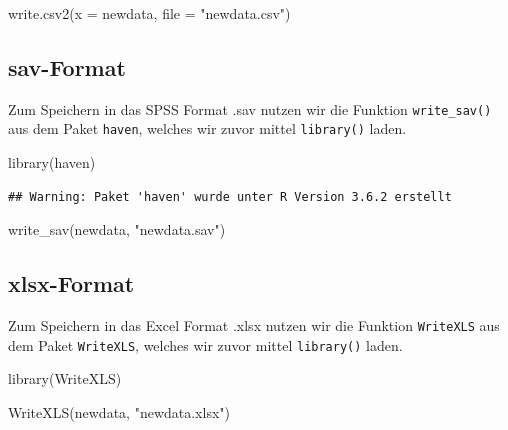 \documentclass[
]{book}
\newenvironment{Shaded}{\begin{snugshade}}{\end{snugshade}}
\newcommand{\AttributeTok}[1]{\textcolor[rgb]{0.77,0.63,0.00}{#1}}
\newcommand{\FunctionTok}[1]{\textcolor[rgb]{0.00,0.00,0.00}{#1}}
\newcommand{\NormalTok}[1]{#1}
\newcommand{\StringTok}[1]{\textcolor[rgb]{0.31,0.60,0.02}{#1}}
\begin{document}
\begin{Shaded}
\begin{Highlighting}[]
\FunctionTok{write.csv2}\NormalTok{(}\AttributeTok{x =}\NormalTok{ newdata, }\AttributeTok{file =} \StringTok{"newdata.csv"}\NormalTok{)}
\end{Highlighting}
\end{Shaded}

\hypertarget{sav-format-1}{%
\subsection{sav-Format}\label{sav-format-1}}

Zum Speichern in das SPSS Format .sav nutzen wir die Funktion \texttt{write\_sav()} aus dem Paket \texttt{haven}, welches wir zuvor mittel \texttt{library()} laden.

\begin{Shaded}
\begin{Highlighting}[]
\FunctionTok{library}\NormalTok{(haven)}
\end{Highlighting}
\end{Shaded}

\begin{verbatim}
## Warning: Paket 'haven' wurde unter R Version 3.6.2 erstellt
\end{verbatim}

\begin{Shaded}
\begin{Highlighting}[]
\FunctionTok{write\_sav}\NormalTok{(newdata, }\StringTok{"newdata.sav"}\NormalTok{)}
\end{Highlighting}
\end{Shaded}

\hypertarget{xlsx-format-1}{%
\subsection{xlsx-Format}\label{xlsx-format-1}}

Zum Speichern in das Excel Format .xlsx nutzen wir die Funktion \texttt{WriteXLS} aus dem Paket \texttt{WriteXLS}, welches wir zuvor mittel \texttt{library()} laden.

\begin{Shaded}
\begin{Highlighting}[]
\FunctionTok{library}\NormalTok{(WriteXLS)}

\FunctionTok{WriteXLS}\NormalTok{(newdata, }\StringTok{"newdata.xlsx"}\NormalTok{)}
\end{Highlighting}
\end{Shaded}
\end{document}

